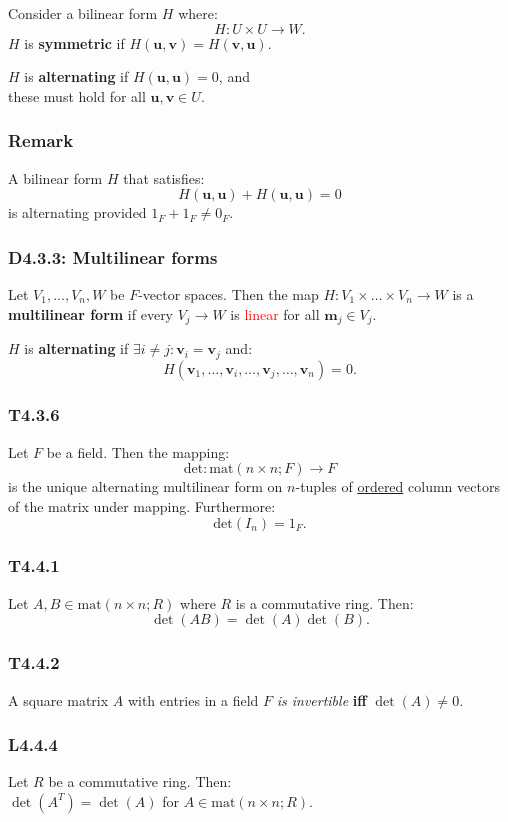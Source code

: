 \documentclass{article}
\newcommand{\vc}[1]{\boldsymbol{#1}}
\begin{document}
\begin{multicols*}{3}
Consider a bilinear form $H$ where:
$$H:U\times U\rightarrow W.$$
$H$ is \textbf{symmetric} if $H(\vc{u},\vc{v})=H(\vc{v},\vc{u})$.

$H$ is \textbf{alternating} if $H(\vc{u},\vc{u})=0$, and \\
these must hold for all $\vc{u},\vc{v}\in U$.

\subsubsection*{Remark}
A bilinear form $H$ that satisfies:
$$H(\vc{u},\vc{u})+H(\vc{u},\vc{u})=0$$
is alternating provided $1_F+1_F\neq0_F$.

\subsubsection*{D4.3.3: Multilinear forms}
Let $V_1,\dots,V_n,W$ be $F$-vector spaces. Then the map
$H:V_1\times\dots\times V_n\rightarrow W$ is a
\textbf{multilinear form} if every $V_j\rightarrow W$
is \textcolor{red}{linear} for all $\vc{m}_j\in V_j$.

$H$ is \textbf{alternating} if $\exists i\neq j:\vc{v}_i=\vc{v}_j$
and:
$$H(\vc{v}_1,\dots,\vc{v}_i,\dots,\vc{v}_j,\dots,\vc{v}_n)=0.$$

\subsubsection*{T4.3.6}
Let $F$ be a field. Then the mapping:
$$\text{det}:\text{mat}(n\times n; F)\rightarrow F$$
is the unique alternating multilinear form on $n$-tuples
of \underline{ordered} column vectors of the matrix
under mapping. Furthermore:
$$\text{det}(I_n)=1_F.$$

\subsubsection*{T4.4.1}
Let $A,B\in\text{mat}(n\times n;R)$ where $R$ is a
commutative ring. Then:
$$\det(AB)=\det(A)\det(B).$$

\subsubsection*{T4.4.2}
A square matrix $A$ with entries in a field $F$ \textit{is invertible}
\textbf{if{}f} $\det(A)\neq0$.

\subsubsection*{L4.4.4}
Let $R$ be a commutative ring. Then: \\
$\det(A^T)=\det(A)$ for $A\in\text{mat}(n\times n; R)$.


\end{multicols*}
\end{document}
